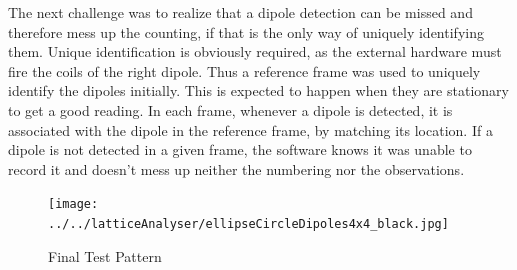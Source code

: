 		The next challenge was to realize that a dipole detection can be missed and therefore mess up the counting, if that is the only way of uniquely identifying them. Unique identification is obviously required, as the external hardware must fire the coils of the right dipole. Thus a reference frame was used to uniquely identify the dipoles initially. This is expected to happen when they are stationary to get a good reading. In each frame, whenever a dipole is detected, it is associated with the dipole in the reference frame, by matching its location. If a dipole is not detected in a given frame, the software knows it was unable to record it and doesn't mess up neither the numbering nor the observations.
		\par

		\begin{figure}[bth]
			\begin{center}
				\texttt{[image: ../../latticeAnalyser/ellipseCircleDipoles4x4\_black.jpg]}
			\end{center}
		\caption[Final Test Pattern]{Final Test Pattern}
		\label{testPattern}
		\end{figure}


